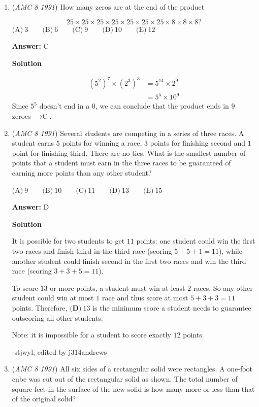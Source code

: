 \begin{enumerate}
	\item (\textit{AMC 8 1991}) How many zeros are at the end of the product

 \[25\times 25\times 25\times 25\times 25\times 25\times 25\times 8\times 8\times 8?\]
$\text{(A)}\ 3 \qquad \text{(B)}\ 6 \qquad \text{(C)}\ 9 \qquad \text{(D)}\ 10 \qquad \text{(E)}\ 12$

 \textbf{Answer: }C



\textbf{Solution}


 \begin{align*} (5^2)^7\times (2^3)^3 &=  5^{14}\times 2^{9} \\ &= 5^5\times 10^9  \end{align*}
Since $5^5$ doesn't end in a $0$, we can conclude that the product ends in $9$ zeroes $\rightarrow \boxed{\text{C}}$.

 


	\item (\textit{AMC 8 1991}) Several students are competing in a series of three races.  A student earns $5$ points for winning a race, $3$ points for finishing second and $1$ point for finishing third.  There are no ties.  What is the smallest number of points that a student must earn in the three races to be guaranteed of earning more points than any other student?


 $\text{(A)}\ 9 \qquad \text{(B)}\ 10 \qquad \text{(C)}\ 11 \qquad \text{(D)}\ 13 \qquad \text{(E)}\ 15$

 \textbf{Answer: }D



\textbf{Solution}

It is possible for two students to get $11$ points: one student could win the first two races and finish third in the third race (scoring $5+5+1=11$), while another student could finish second in the first two races and win the third race (scoring $3+3+5=11$).

 To score $13$ or more points, a student must win at least $2$ races. So any other student could win at most $1$ race and thus score at most $5 + 3 + 3 = 11$ points.  Therefore, $\boxed{\textbf{(D)}\ 13}$ is the minimum score a student needs to guarantee outscoring all other students.

 Note: it is impossible for a student to score exactly $12$ points. 

 -stjwyl, edited by j314andrews

 


	\item (\textit{AMC 8 1991}) All six sides of a rectangular solid were rectangles.  A one-foot cube was cut out of the rectangular solid as shown.  The total number of square feet in the surface of the new solid is how many more or less than that of the original solid?



\end{enumerate}
